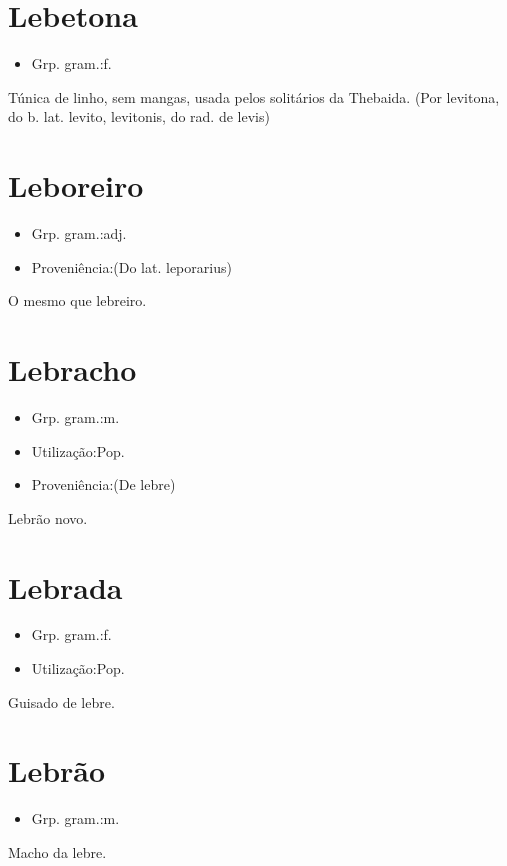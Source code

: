 \section{Lebetona}
\begin{itemize}
\item {Grp. gram.:f.}
\end{itemize}
Túnica de linho, sem mangas, usada pelos solitários da Thebaida.
(Por \textunderscore levitona\textunderscore , do b. lat. \textunderscore levito\textunderscore , \textunderscore levitonis\textunderscore , do rad. de \textunderscore levis\textunderscore )
\section{Leboreiro}
\begin{itemize}
\item {Grp. gram.:adj.}
\end{itemize}
\begin{itemize}
\item {Proveniência:(Do lat. \textunderscore leporarius\textunderscore )}
\end{itemize}
O mesmo que \textunderscore lebreiro\textunderscore .
\section{Lebracho}
\begin{itemize}
\item {Grp. gram.:m.}
\end{itemize}
\begin{itemize}
\item {Utilização:Pop.}
\end{itemize}
\begin{itemize}
\item {Proveniência:(De \textunderscore lebre\textunderscore )}
\end{itemize}
Lebrão novo.
\section{Lebrada}
\begin{itemize}
\item {Grp. gram.:f.}
\end{itemize}
\begin{itemize}
\item {Utilização:Pop.}
\end{itemize}
Guisado de lebre.
\section{Lebrão}
\begin{itemize}
\item {Grp. gram.:m.}
\end{itemize}
Macho da lebre.
